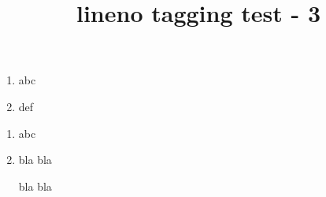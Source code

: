 \documentclass{article}
\title{lineno tagging test - 3}
\begin{document}
\begin{linenumbers}
\begin{enumerate}
\item abc
\item def
\end{enumerate}
\end{linenumbers}

\begin{enumerate}
\item abc
\item
\begin{linenumbers}
bla bla

bla bla
\end{linenumbers}
\end{enumerate}
\end{document}
